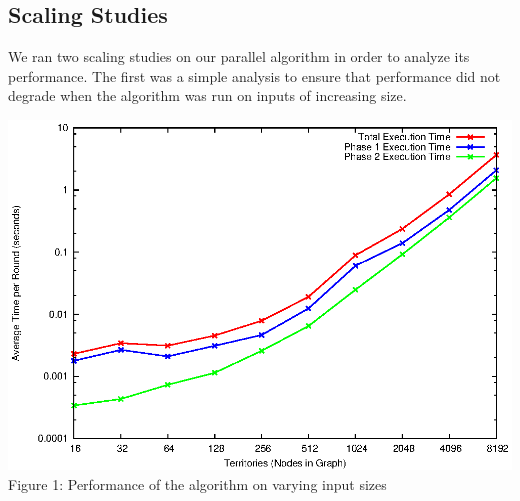 \documentclass[10pt]{article}
\begin{document}
\begin{multicols}{2}
		\subsection*{Scaling Studies}
		We ran two scaling studies on our parallel algorithm in order to analyze its performance.
		The first was a simple analysis to ensure that performance did not degrade when the algorithm was run on inputs of increasing size.
		\begin{center}
			\includegraphics[width=.45\textwidth]{graphs.eps}
			\small{Figure 1: Performance of the algorithm on varying input sizes}
		\end{center}


\end{multicols}
\end{document}
